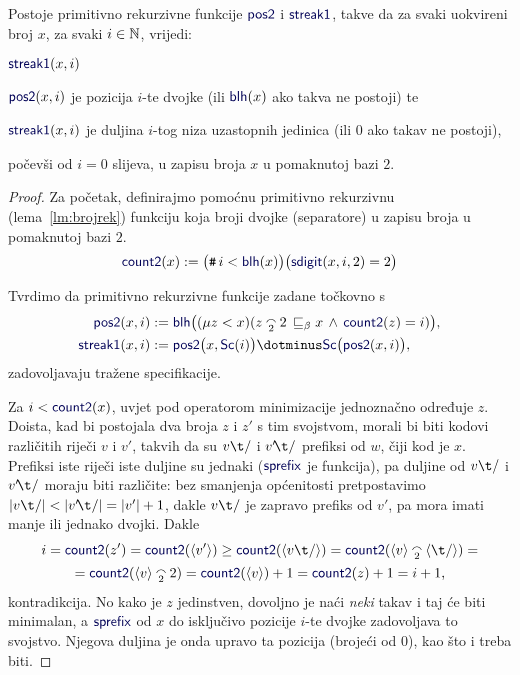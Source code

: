 \begin{lema}[{name=[primitivna rekurzivnost raščlambe binarnih zapisa]}]\label{lm:pos2streak1prn}
Postoje primitivno rekurzivne funkcije $\f{pos2}$ i $\f{streak1}$, takve da za svaki uokvireni broj $x$, za svaki $i\in{\mathbb N}$, vrijedi:
\begin{labeling}{$\f{streak1}(x,i)$}
    \item[$\f{pos2}(x,i)$] je pozicija $i$-te dvojke (ili $\f{blh}(x)$ ako takva ne postoji) te
    \item[$\f{streak1}(x,i)$] je duljina $i$-tog niza uzastopnih jedinica (ili $0$ ako takav ne postoji),
\end{labeling}
počevši od $i=0$ slijeva, u zapisu broja $x$ u pomaknutoj bazi $2$.
\end{lema}
\begin{proof}
Za početak, definirajmo pomoćnu primitivno rekurzivnu (lema~\ref{lm:brojrek}) funkciju koja broji dvojke (separatore) u zapisu broja u pomaknutoj bazi $2$.
\begin{equation}
    \f{count2}(x):=\bigl(\num i<\f{blh}(x)\bigr)\bigl(\f{sdigit}(x,i,2)=2\bigr)
\end{equation}

Tvrdimo da primitivno rekurzivne funkcije zadane točkovno s
\begin{align}
    \f{pos2}(x,i)&:=\f{blh}\bigl((\mu z<x)(z\conc22\,\sqsubseteq_\beta x\,\land\,\f{count2}(z)=i)\bigr),\\
    \f{streak1}(x,i)&:=\f{pos2}\bigl(x,\f{Sc}(i)\bigr)\dotminus\f{Sc}\bigl(\f{pos2}(x,i)\bigr),
\end{align}
zadovoljavaju tražene specifikacije.

Za $i<\f{count2}(x)$, uvjet pod operatorom minimizacije jednoznačno određuje $z$. Doista, kad bi postojala dva broja $z$ i $z'$ s tim svojstvom, morali bi biti kodovi različitih riječi $v$ i $v'$, takvih da su $v\t/$ i $v'\!\t/$ prefiksi od $w$, čiji kod je $x$. Prefiksi iste riječi iste duljine su jednaki ($\f{sprefix}$ je funkcija), pa duljine od $v\t/$ i $v'\!\t/$ moraju biti različite: bez smanjenja općenitosti pretpostavimo $\dulj{v\t/}<\dulj{v'\!\t/}=\dulj{v'}+1$, dakle $v\t/$ je zapravo prefiks od $v'$, pa mora imati manje ili jednako dvojki. Dakle
\begin{multline}
    i=\f{count2}(z')=\f{count2}(\kr{v'})\ge\f{count2}(\kr{v\t/})=\f{count2}(\kr v\conc2\kr{\t/})=\\
    =\f{count2}(\kr v\conc22)=\f{count2}(\kr v)+1=\f{count2}(z)+1=i+1\text,
\end{multline}
    kontradikcija. No kako je $z$ jedinstven, dovoljno je naći \emph{neki} takav i taj će biti minimalan, a $\f{sprefix}$ od $x$ do isključivo pozicije $i$-te dvojke zadovoljava to svojstvo. Njegova duljina je onda upravo ta pozicija (brojeći od $0$), kao što i treba biti.


\end{proof}
